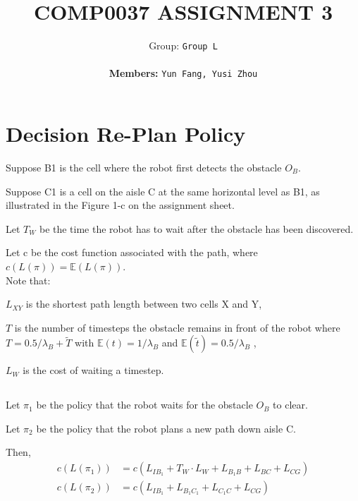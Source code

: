 \documentclass{article}
\title{COMP0037 ASSIGNMENT 3}
\author{
 Group: \texttt{Group L}\\\\
 \textbf{Members:} \texttt{Yun Fang, Yusi Zhou}
}
\begin{document}
\maketitle


\section{Decision Re-Plan Policy}

Suppose B1 is the cell where the robot first detects the obstacle $O_{B}$. 

Suppose C1 is a cell on the aisle C at the same horizontal level as B1, as illustrated in the Figure 1-c on the assignment sheet. 

Let $T_{W}$ be the time the robot has to wait after the obstacle has been discovered.

Let c be the cost function associated with the path, where $c(L(\pi)) = \mathbb{E}(L(\pi)) $. \\

Note that:

$L_{XY}$ is the shortest path length between two cells X and Y, 

$T$ is the number of timesteps the obstacle remains in front of the robot where $ T = 0.5/ \lambda_{B} + \widetilde{T}$ with $\mathbb{E}(t) = 1/\lambda_{B}$ and $\mathbb{E}(\tilde{t}) = 0.5/ \lambda_{B}$ , 

$L_{W}$ is the cost of waiting a timestep.

\subsection{}

Let $\pi_{1}$ be the policy that the robot waits for the obstacle $O_{B}$ to clear.

Let $\pi_{2}$ be the policy that the robot plans a new path down aisle C.

Then,
\begin{align*}
c(L(\pi_{1})) &= c(L_{IB_{1}} + T_{W} \cdot L_{W} + L_{B_{1}B} + L_{BC} + L_{CG}) \\
c(L(\pi_{2})) &= c(L_{IB_{1}} +  L_{B_{1}C_{1}} + L_{C_{1}C} + L_{CG}) \\
\end{align*}
\end{document}
